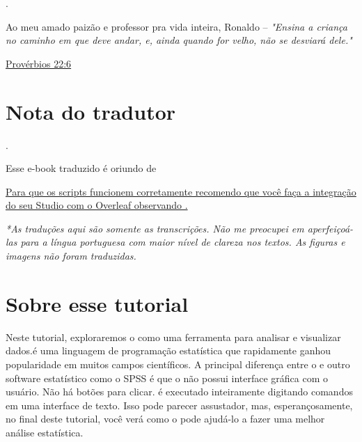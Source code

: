 \documentclass{article}
\begin{document}
\thispagestyle{empty}
\newpage

.

\vspace{22cm}
Ao meu amado paizão e professor pra vida inteira, Ronaldo --  \textit{"Ensina a criança no caminho em que deve andar, e, ainda quando for velho, não se desviará dele."}

\vspace{.15cm}
\hspace{13cm}\href{https://bibliaportugues.com/proverbs/22-6.htm}{Provérbios 22:6}

\thispagestyle{empty}


\newpage
\tableofcontents



\thispagestyle{headings}

\newpage
\section*{Nota do tradutor}
.

\vspace{5cm}
Esse e-book traduzido é oriundo de 

\vspace{.25cm}
\href{https://static1.squarespace.com/static/5757268f7da24f26ca7b21d2/t/5c7587114192021796d7cc84/1551206162093/R_Overleaf_Integration.pdf}{Para que os scripts funcionem corretamente recomendo que você faça a integração do seu \faRProject Studio com o Overleaf observando .}

\vspace{.25cm}
\textit{*As traduções aqui são somente as transcrições. Não me preocupei em aperfeiçoá-las para a língua portuguesa com maior nível de clareza nos textos. As figuras e imagens não foram traduzidas.}

\newpage

\section{Sobre esse tutorial}


Neste tutorial, exploraremos o \faRProject como uma ferramenta para analisar e visualizar dados.\faRProject é uma linguagem de programação estatística que rapidamente ganhou popularidade em muitos campos científicos. A principal diferença entre o \faRProject e outro software estatístico como o SPSS é que o \faRProject não possui interface gráfica com o usuário. Não há botões para clicar. \faRProject é executado inteiramente digitando comandos em uma interface de texto. Isso pode parecer assustador, mas, esperançosamente, no final deste tutorial, você verá como o \faRProject pode ajudá-lo a fazer uma melhor análise estatística.
\end{document}

